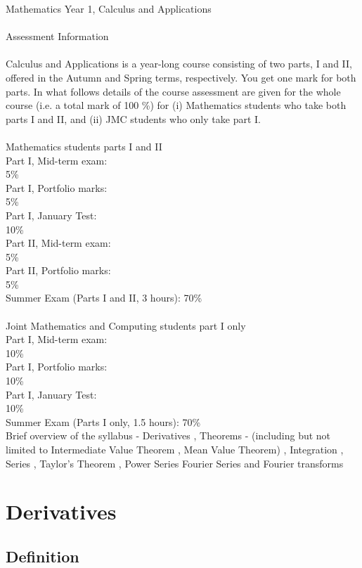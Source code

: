 \documentclass{book}
\begin{document}
Mathematics Year 1, Calculus and Applications\\~\\Assessment Information\\~\\
Calculus and Applications is a year-long course consisting of two parts, I and II, offered
in the Autumn and Spring terms, respectively.  You get one mark for both parts.  In what
follows details of the course assessment are given for the
whole course
(i.e.  a total mark of 100 \%) for (i) Mathematics students who take both parts I and II, and (ii) JMC students
who only take part I.\\~\\
Mathematics students parts I and II\\
Part I, Mid-term exam:\\
5\%\\
Part I, Portfolio marks:\\
5\%\\
Part I, January Test:\\
10\%\\
Part II, Mid-term exam:\\
5\%\\
Part II, Portfolio marks:\\
5\%\\
Summer Exam (Parts I and II, 3 hours):    70\%\\~\\
Joint Mathematics and Computing students part I only\\
Part I, Mid-term exam:\\
10\%\\
Part I, Portfolio marks:\\
10\%\\
Part I, January Test:\\
10\%\\
Summer Exam (Parts I only, 1.5 hours):    70\%\\
Brief overview of the syllabus - Derivatives , Theorems - (including but not limited to Intermediate Value Theorem , Mean Value Theorem) , Integration , Series , Taylor's Theorem , Power Series  Fourier Series and Fourier transforms

\chapter{Derivatives}
\section{Definition}
\end{document}
